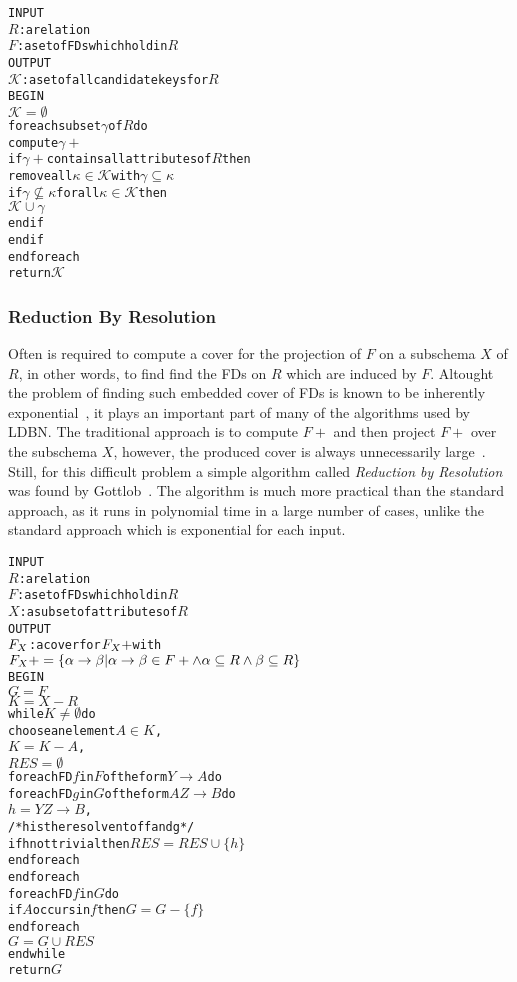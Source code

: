 \begin{alltt}
INPUT 
  \(R\) : a relation
  \(F\) : a set of FDs which hold in \(R\)
OUTPUT 
  \(\mathcal{K}\) : a set of all candidate keys for \(R\)
BEGIN
  \(\mathcal{K} = \emptyset\)
  foreach subset \(\gamma\) of \(R\) do
    compute \(\gamma+\)
    if \(\gamma+ \) contains all attributes of \(R\) then
      remove all \(\kappa \in \mathcal{K}\) with  \(\gamma \subseteq \kappa\)
      if \(\gamma \nsubseteq \kappa\) for all \(\kappa \in \mathcal{K}\) then
        \(\mathcal{K} \cup \gamma\)
      end if
    end if
  end foreach
return \(\mathcal{K}\)
\end{alltt}

\subsubsection{Reduction By Resolution}
Often is required to compute a cover for the projection of $F$ on a subschema $X$ of $R$, in 
other words, to find find the FDs on $R$ which are induced by $F$. Altought the problem of
finding such embedded cover of FDs is
known to be inherently exponential~\cite{p11}, it plays an important part of many of the algorithms
used by LDBN. The traditional approach is to compute $F+$ and then project $F+$ over the subschema $X$,
however, the produced cover
is always unnecessarily large~\cite{p4}. Still, for this difficult problem a simple 
algorithm called \textit{Reduction by Resolution}
was found by Gottlob~\cite{p4}. The algorithm is much more practical than the standard approach,
as it runs in polynomial time in a large number of cases, unlike the standard approach
which is exponential for each input. 

\begin{alltt}
INPUT 
  \(R\) : a relation
  \(F\) : a set of FDs which hold in \(R\)
  \(X\) : a subset of attributes of \(R\)
OUTPUT 
  \(F\sb{X}\) : a cover for \(F\sb{X}+\) with 
           \(F\sb{X}+ = \{\alpha\rightarrow\beta | \alpha \rightarrow \beta \in F+ \wedge \alpha \subseteq R \wedge \beta \subseteq R\}\)
BEGIN 
  \(G = F\)
  \(K = X - R\)
  while \(K \neq \emptyset\) do
    choose an element \(A \in K\),
    \(K = K - A\),
    \(RES = \emptyset\)
    foreach FD \(f\) in \(F\) of the form \(Y \rightarrow A\) do
      foreach FD \(g\) in \(G\) of the form \(AZ \rightarrow B\) do
        \(h = YZ \rightarrow B\),
        /* h is the resolvent of f and g */
        if h not trivial then \(RES = RES \cup \{h\}\)
      end foreach
    end foreach
    foreach FD \(f\) in \(G\) do
      if \(A\) occurs in \(f\) then \(G = G - \{f\}\)
    end foreach
    \(G = G \cup RES\)
  end while
  return \(G\)
\end{alltt}

